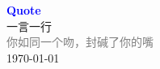 \vspace*{\fill}
\begin{center}
    \textcolor{blue}{\Huge\textbf{Quote}} \\[1em]
    \textcolor{blue!60!black}{\Large 一言一行} \\[2em]
    \textcolor{gray}{\large 你如同一个吻，封碱了你的嘴} \\[1em]
    \today
\end{center}
\vspace*{\fill}
\clearpage


\clearpage

\clearpage


